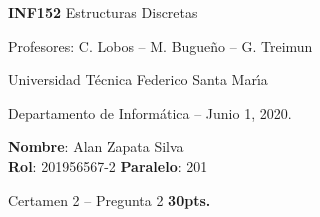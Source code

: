 \documentclass[letterpaper,10pt]{article}
\begin{document}
\thispagestyle{empty}

\begin{minipage}[t]{0.6\textwidth}

{\LARGE \textbf{INF152} Estructuras Discretas}

{\large Profesores: C. Lobos -- M. Bugueño -- G. Treimun}

Universidad T\'ecnica Federico Santa Mar\'{\i}a

Departamento de Inform\'atica -- Junio 1, 2020.

\end{minipage}
\hfill
\begin{minipage}[t]{0.35\textwidth}
\textbf{Nombre}: Alan Zapata Silva\\[0.3cm]
\textbf{Rol}: 201956567-2 \textbf{Paralelo}: 201
\end{minipage}

\vspace{0.8cm}

{\Large Certamen 2 -- Pregunta 2 \textbf{30pts.}} 

\vspace{0.4cm}

\end{document}
